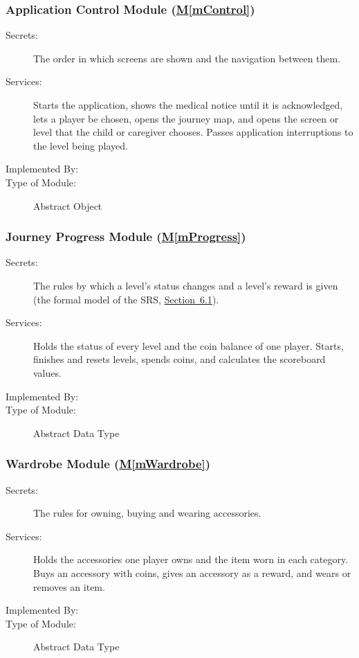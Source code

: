 \documentclass[12pt, titlepage]{article}
\newcommand{\mref}[1]{\hyperref[#1]{M\ref*{#1}}}
\newcommand{\srsurl}{https://team-hindsight.github.io/ophthamology-game/SRS/SRS.pdf}
\newcommand{\srsitemref}[2]{\href{\srsurl\#nameddest=#1}{#2}}
\begin{document}
\subsubsection{Application Control Module (\mref{mControl})}

\begin{description}
\item[Secrets:] The order in which screens are shown and the navigation
  between them.
\item[Services:] Starts the application, shows the medical notice until it is
  acknowledged, lets a player be chosen, opens the journey map, and opens the
  screen or level that the child or caregiver chooses. Passes application
  interruptions to the level being played.
\item[Implemented By:] \progname{}
\item[Type of Module:] Abstract Object
\end{description}

\subsubsection{Journey Progress Module (\mref{mProgress})}

\begin{description}
\item[Secrets:] The rules by which a level's status changes and a level's
  reward is given (the formal model of the SRS,
  \srsitemref{sec_FormalSpec}{Section~6.1}).
\item[Services:] Holds the status of every level and the coin balance of one
  player. Starts, finishes and resets levels, spends coins, and calculates the
  scoreboard values.
\item[Implemented By:] \progname{}
\item[Type of Module:] Abstract Data Type
\end{description}

\subsubsection{Wardrobe Module (\mref{mWardrobe})}

\begin{description}
\item[Secrets:] The rules for owning, buying and wearing accessories.
\item[Services:] Holds the accessories one player owns and the item worn in
  each category. Buys an accessory with coins, gives an accessory as a reward,
  and wears or removes an item.
\item[Implemented By:] \progname{}
\item[Type of Module:] Abstract Data Type
\end{description}
\end{document}
